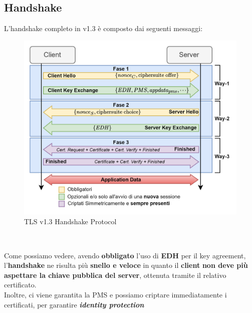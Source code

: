 \subsection{Handshake}
L'handshake completo in v1.3 è composto dai seguenti messaggi:
\begin{figure}[h]
    \centering
    \includegraphics{image/handshakev13.png}
    \caption{TLS v1.3 Handshake Protocol}
    \label{fig:tlshand13}
\end{figure}\\
\begin{remark}
Come possiamo vedere, avendo \textbf{obbligato} l'uso di \textbf{EDH} per il key agreement, l'\textbf{handshake} ne risulta più \textbf{snello e veloce} in quanto il \textbf{client} \textbf{non deve più aspettare la chiave pubblica del server}, ottenuta tramite il relativo certificato.\\
Inoltre, ci viene garantita la PMS e possiamo criptare immediatamente i certificati, per garantire \textit{\textbf{identity protection}}
\end{remark}\pagebreak
